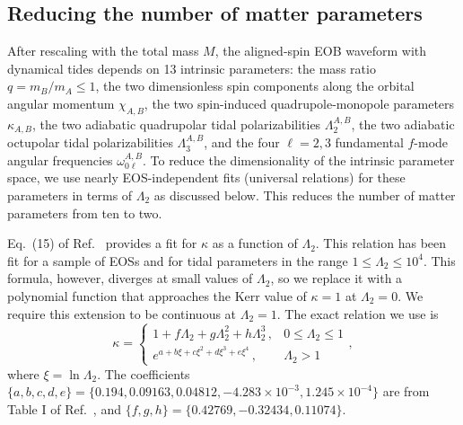 \documentclass[prd,aps,letter,twocolumn,floatfix,notitlepage,nofootinbib]{revtex4-1}
\begin{document}
\subsection{Reducing the number of matter parameters}

After rescaling with the total mass $M$, the aligned-spin EOB waveform with dynamical tides depends on 13 intrinsic parameters: the mass ratio $q=m_B/m_A\leq1$, the two dimensionless spin components along the orbital angular momentum $\chi_{A,B}$, the two spin-induced quadrupole-monopole parameters $\kappa_{A,B}$, the two adiabatic quadrupolar tidal polarizabilities $\Lambda_2^{A,B}$, the two adiabatic octupolar tidal polarizabilities $\Lambda_3^{A,B}$, and the four $\ell=2,3$ fundamental $f$-mode angular frequencies $\omega_{0\ell}^{A,B}$. To reduce the dimensionality of the intrinsic parameter space, we use nearly EOS-independent fits (universal relations) for these parameters in terms of $\Lambda_2$ as discussed below. This reduces the number of matter parameters from ten to two.

Eq.~(15) of Ref.~\cite{YagiYunes2017} provides a fit for $\kappa$ as a function of $\Lambda_2$. This relation has been fit for a sample of EOSs and for tidal parameters in the range $1 \leq \Lambda_2\leq10^4$. This formula, however, diverges at small values of $\Lambda_2$, so we replace it with a polynomial function that approaches the Kerr value of $\kappa = 1$ at $\Lambda_2 = 0$. We require this extension to be continuous at $\Lambda_2 = 1$. The exact relation we use is
\begin{equation}
\kappa = \left\{\begin{array}{ll}
1 + f \Lambda_2 + g \Lambda_2^2 + h \Lambda_2^3\, , & 0 \leq \Lambda_2 \le 1 \\
e^{a + b \xi + c \xi^2 + d \xi^3 + e \xi^4}\, , & \Lambda_2 > 1
\end{array}\right.,
\end{equation}
where $\xi = \ln\Lambda_2$. The coefficients $\{a, b, c, d, e\} = \{ 0.194, 0.09163, 0.04812, -4.283\times 10^{-3}, 1.245\times 10^{-4} \}$ are from Table I of Ref.~\cite{YagiYunes2017}, and $\{f, g, h\} = \{0.42769, -0.32434, 0.11074\}$.
\end{document}
